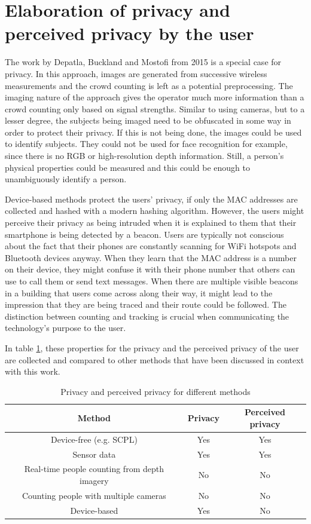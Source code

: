 \documentclass[conference]{IEEEtran}
\begin{document}
\section{Elaboration of privacy and perceived privacy by the user}
The work by Depatla, Buckland and Mostofi from 2015 \cite{DepatlaMostofi2015} is a special case for privacy. In this approach, images are generated from successive wireless measurements and the crowd counting is left as a potential preprocessing. The imaging nature of the approach gives the operator much more information than a crowd counting only based on signal strengths. Similar to using cameras, but to a lesser degree, the subjects being imaged need to be obfuscated in some way in order to protect their privacy. If this is not being done, the images could be used to identify subjects. They could not be used for face recognition for example, since there is no RGB or high-resolution depth information. Still, a person's physical properties could be measured and this could be enough to unambiguously identify a person.
\par
Device-based methods protect the users' privacy, if only the MAC addresses are collected and hashed with a modern hashing algorithm. However, the users might perceive their privacy as being intruded when it is explained to them that their smartphone is being detected by a beacon. Users are typically not conscious about the fact that their phones are constantly scanning for WiFi hotspots and Bluetooth devices anyway. When they learn that the MAC address is a number on their device, they might confuse it with their phone number that others can use to call them or send text messages. When there are multiple visible beacons in a building that users come across along their way, it might lead to the impression that they are being traced and their route could be followed. The distinction between counting and tracking is crucial when communicating the technology's purpose to the user.
\par
In table \ref{table_privacy}, these properties for the privacy and the perceived privacy of the user are collected and compared to other methods that have been discussed in context with this work.


\begin{table}
\caption{Privacy and perceived privacy for different methods}
\label{table_privacy}
\centering
\begin{tabular}{c || c || c}
\hline
\bfseries \textbf{Method} & \textbf{Privacy} & \bfseries\textbf{Perceived privacy} \\
\hline
Device-free (e.g. SCPL) & Yes & Yes\\
\hline
Sensor data & Yes & Yes \\
\hline
Real-time people counting from depth imagery & No & No \\
\hline
Counting people with multiple cameras & No & No \\
\hline
Device-based & Yes & No
\end{tabular}
\end{table}
\end{document}
